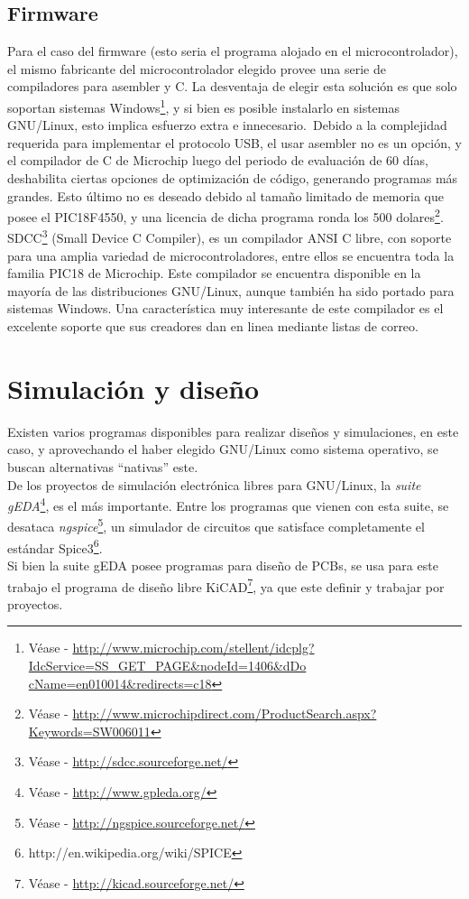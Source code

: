 \subsection{Firmware}
Para el caso del firmware (esto seria el programa alojado en el
microcontrolador), el mismo fabricante del microcontrolador elegido provee una
serie de compiladores para asembler y C. La desventaja de elegir esta
soluci\'on es que solo soportan sistemas Windows\footnote{V\'ease -
\url{
http://www.microchip.com/stellent/idcplg?IdcService=SS_GET_PAGE&nodeId=1406&dDo
cName=en010014&redirects=c18}}, y si bien es posible instalarlo en sistemas
GNU/Linux, esto implica esfuerzo extra e innecesario.\
Debido a la complejidad requerida para implementar el protocolo USB, el usar
asembler no es un opci\'on, y el compilador de C de Microchip luego del
periodo de evaluaci\'on de 60 d\'ias, deshabilita ciertas opciones de
optimizaci\'on de c\'odigo, generando programas m\'as grandes. Esto \'ultimo no
es
deseado debido al tama\~no limitado de memoria que posee el PIC18F4550, y una
licencia de dicha programa ronda los 500 dolares\footnote{V\'ease -
\url{http://www.microchipdirect.com/ProductSearch.aspx?Keywords=SW006011}}.\\

SDCC\footnote{V\'ease - \url{http://sdcc.sourceforge.net/}} (Small Device C
Compiler), es un compilador ANSI C libre, con soporte para una amplia variedad
de microcontroladores, entre ellos se encuentra toda la familia PIC18 de
Microchip. Este compilador se encuentra disponible en la mayor\'ia de las
distribuciones GNU/Linux, aunque tambi\'en ha sido portado para sistemas
Windows. Una caracter\'istica muy interesante de este compilador es el
excelente
soporte que sus creadores dan en linea mediante listas de correo.\\


\section{Simulaci\'on y dise\~no}
Existen varios programas disponibles para realizar dise\~nos y simulaciones,
en este caso, y aprovechando el haber elegido GNU/Linux como sistema
operativo, se buscan alternativas ``nativas'' este.\\

De los proyectos de simulaci\'on electr\'onica libres para GNU/Linux, la
\emph{suite gEDA}\footnote{V\'ease - \url{http://www.gpleda.org/}}, es el m\'as
importante. Entre los programas que vienen con esta suite, se desataca
\emph{ngspice}\footnote{V\'ease - \url{http://ngspice.sourceforge.net/}}, un
simulador de circuitos que satisface completamente el est\'andar
Spice3\footnote{http://en.wikipedia.org/wiki/SPICE}.\\

Si bien la suite gEDA posee programas para dise\~no de PCBs, se usa para este
trabajo el programa de dise\~no libre KiCAD\footnote{V\'ease -
\url{http://kicad.sourceforge.net/}}, ya que este definir y trabajar por
proyectos.






